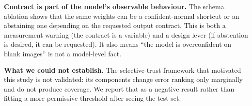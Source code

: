\textbf{Contract is part of the model's observable behaviour.} The schema ablation shows that the same weights can be a confident-normal shortcut or an abstaining one depending on the requested output contract. This is both a measurement warning (the contract is a variable) and a design lever (if abstention is desired, it can be requested). It also means ``the model is overconfident on blank images'' is not a model-level fact.

\textbf{What we could not establish.} The selective-trust framework that motivated this study is not validated: its components change error ranking only marginally and do not produce coverage. We report that as a negative result rather than fitting a more permissive threshold after seeing the test set.

